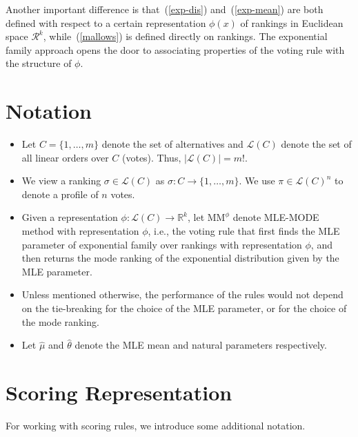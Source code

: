 \documentclass[10pt,letterpaper]{article}
\newcommand{\R}{\ensuremath{\mathcal{R}}}
\newcommand{\calL}{{\mathcal{L}}}
\newcommand{\mm}{\text{MM}}
\newcommand{\rank}{{\calL(C)}}
\newcommand{\uni}{{\rank^n}}
\newcommand{\muhat}{\hat{\mu}}
\newcommand{\that}{\hat{\theta}}
\begin{document}
Another important difference is that~(\ref{exp-dis}) and~(\ref{exp-mean}) are both defined with respect to a certain representation $\phi(x)$ of rankings in Euclidean space $\R^k$, while~(\ref{mallows}) is defined directly on rankings. The exponential family approach opens the door to associating properties of the voting rule with the structure of $\phi$.



\section{Notation}
\label{sec:prelim}

\begin{itemize}
\item Let $C = \{1,\ldots,m\}$ denote the set of alternatives and $\rank$ denote the set of all linear orders over $C$ (votes). Thus, $|\rank| = m!$. 
\item We view a ranking $\sigma \in \rank$ as $\sigma: C \rightarrow \{1,\ldots,m\}$. We use $\pi \in \uni$ to denote a profile of $n$ votes. 
\item Given a representation $\phi: \rank \rightarrow \mathbb{R}^k$, let $\mm^{\phi}$ denote MLE-MODE method with representation $\phi$, i.e., the voting rule that first finds the MLE parameter of exponential family over rankings with representation $\phi$, and then returns the mode ranking of the exponential distribution given by the MLE parameter. 
\item Unless mentioned otherwise, the performance of the rules would not depend on the tie-breaking for the choice of the MLE parameter, or for the choice of the mode ranking.
\item Let $\muhat$ and $\that$ denote the MLE mean and natural parameters respectively. 
\end{itemize}


\section{Scoring Representation}
\label{sec:scoring}

For working with scoring rules, we introduce some additional notation.
\end{document}
